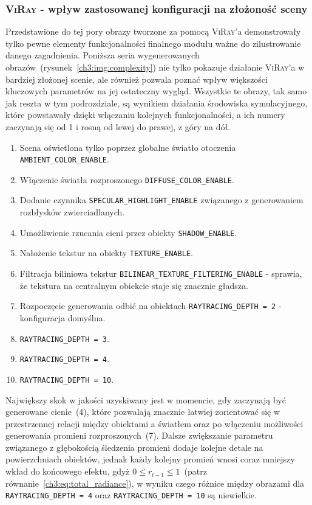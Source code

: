 \subsubsection{\textsc{ViRay} - wpływ zastosowanej konfiguracji na złożoność sceny}
Przedstawione do tej pory obrazy tworzone za pomocą \textsc{ViRay}'a demonstrowały tylko pewne elementy funkcjonalności finalnego modułu ważne do zilustrowanie danego zagadnienia. Poniższa seria wygenerowanych obrazów~(rysunek~\ref{ch3:img:complexity}) nie tylko pokazuje działanie \textsc{ViRay}'a w bardziej złożonej scenie, ale również pozwala poznać wpływ większości kluczowych parametrów na jej ostateczny wygląd. Wszystkie te obrazy, tak samo jak reszta w tym podrozdziale, są wynikiem działania środowiska symulacyjnego, które powstawały dzięki włączaniu kolejnych funkcjonalności, a ich numery zaczynają się od 1 i rosną od lewej do prawej, z góry na dół.
\begin{enumerate}
\item Scena oświetlona tylko poprzez globalne światło otoczenia \texttt{AMBIENT\_COLOR\_ENABLE}.
\item Włączenie światła rozproszonego \texttt{DIFFUSE\_COLOR\_ENABLE}.
\item Dodanie czynnika \texttt{SPECULAR\_HIGHLIGHT\_ENABLE} związanego z generowaniem rozbłysków zwierciadlanych.
\item Umożliwienie rzucania cieni przez obiekty \texttt{SHADOW\_ENABLE}.
\item Nałożenie tekstur na obiekty \texttt{TEXTURE\_ENABLE}.
\item Filtracja biliniowa tekstur \texttt{BILINEAR\_TEXTURE\_FILTERING\_ENABLE} - sprawia, że tekstura na centralnym obiekcie staje się znacznie gładsza.
\item Rozpoczęcie generowania odbić na obiektach \texttt{RAYTRACING\_DEPTH = 2} - konfiguracja domyślna.
\item \texttt{RAYTRACING\_DEPTH = 3}.
\item \texttt{RAYTRACING\_DEPTH = 4}.
\item \texttt{RAYTRACING\_DEPTH = 10}.
\end{enumerate}

Największy skok w jakości uzyskiwany jest w momencie, gdy zaczynają być generowane cienie~(4), które pozwalają znacznie łatwiej zorientować się w przestrzennej relacji między obiektami a światłem oraz po włączeniu możliwości generowania promieni rozproszonych~(7). Dalsze zwiększanie parametru związanego z głębokością śledzenia promieni dodaje kolejne detale na powierzchniach obiektów, jednak każdy kolejny promień wnosi coraz mniejszy wkład do końcowego efektu, gdyż $0 \leq r_{l-1} \leq 1$~(patrz równanie~\eqref{ch3:eq:total_radiance}), w wyniku czego różnice między obrazami dla \texttt{RAYTRACING\_DEPTH = 4} oraz \texttt{RAYTRACING\_DEPTH = 10} są niewielkie.

